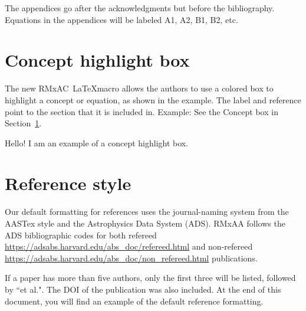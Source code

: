 \documentclass[10pt,letter,twoside]{rmaa-rho-class/rmac-rho}
\newcommand\rmaatex{RMxAC~\LaTeX}
\begin{document}
The appendices go after the acknowledgments but before the
bibliography. Equations in the appendices will be labeled
A1, A2, B1, B2, etc.

\section{Concept highlight box}\label{box:box1}

 
The new \rmaatex macro allows the authors to use a colored box to highlight a concept or equation, as shown in the example. The label and reference point to the section that it is included in. Example: See the Concept box in Section~\ref{box:box1}.  
    
        \begin{rhoenv}[frametitle=Highlight Concept Box,backgroundcolor=\rhotheme!22]
            Hello! I am an example of a concept highlight box. \label{box:boxy}
        \end{rhoenv}
    





\section{Reference style}

     Our default formatting for references uses the journal-naming system from the AASTex style and the Astrophysics Data System (ADS). RMxAA follows the ADS bibliographic codes for both refereed \url{https://adsabs.harvard.edu/abs_doc/refereed.html} and non-refereed \url{https://adsabs.harvard.edu/abs_doc/non_refereed.html} publications.
    
    If a paper has more than five authors, only the first three will be listed, followed by ``et al.". The DOI of the publication was also included. At the end of this document, you will find an example of the default reference formatting. 
\end{document}
